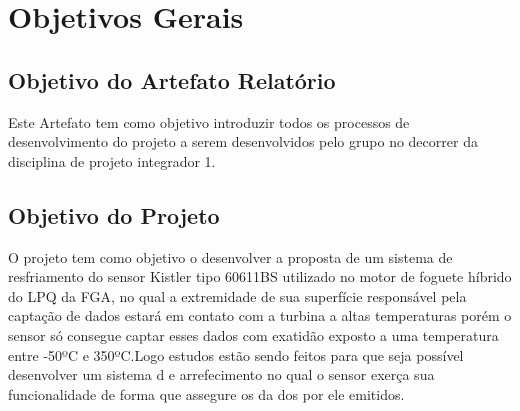 \chapter{Objetivos Gerais}

\section{Objetivo do Artefato Relatório}

Este Artefato tem como objetivo introduzir todos os processos de desenvolvimento do projeto a serem desenvolvidos pelo grupo no decorrer da disciplina  de projeto integrador 1.

\section{Objetivo do Projeto}

O projeto tem como objetivo o desenvolver a proposta de um sistema de resfriamento do sensor Kistler tipo 60611BS utilizado no motor de foguete híbrido  do LPQ da FGA, no qual a extremidade de sua superfície responsável pela captação de dados estará em contato com a turbina a altas temperaturas porém o sensor só consegue captar esses dados com exatidão exposto a uma temperatura entre -50ºC e 350ºC.Logo estudos estão sendo feitos para que seja possível desenvolver um sistema d e arrefecimento no qual o sensor exerça sua funcionalidade de forma que assegure os da dos por ele emitidos.
